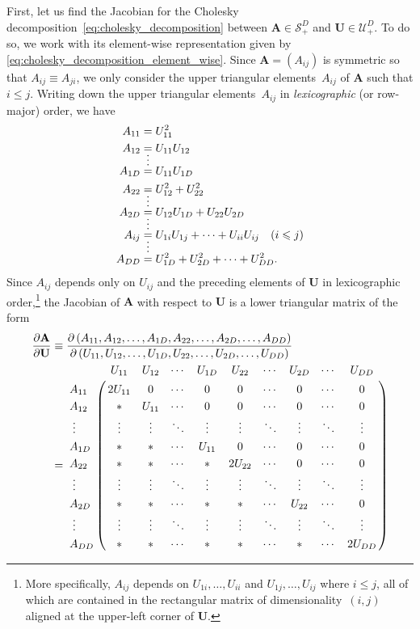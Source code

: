\documentclass[12pt,a4paper]{article}
\begin{document}
First, let us find the Jacobian for
the Cholesky decomposition~\eqref{eq:cholesky_decomposition} between
$\mathbf{A} \in \mathcal{S}_{+}^{D}$ and $\mathbf{U} \in \mathcal{U}_{+}^{D}$.
To do so, we work with its element-wise representation given by
\eqref{eq:cholesky_decomposition_element_wise}.
Since $\mathbf{A} = \left( A_{ij} \right)$ is symmetric so that $A_{ij} \equiv A_{ji}$,
we only consider the upper triangular elements~$A_{ij}$ of $\mathbf{A}$ such that $i \leqslant j$.
Writing down the upper triangular elements~$A_{ij}$ in \emph{lexicographic} (or row-major) order,
we have
\begin{align}
A_{11} &= U_{11}^{2} \\
A_{12} &= U_{11} U_{12} \\
\shortvdotswithin{=}
A_{1D} &= U_{11} U_{1D} \\
A_{22} &= U_{12}^{2} + U_{22}^{2} \\
\shortvdotswithin{=}
A_{2D} &= U_{12} U_{1D} + U_{22} U_{2D} \\
\shortvdotswithin{=}
A_{ij} &= U_{1i} U_{1j} + \dots + U_{ii} U_{ij} \quad (i \leqslant j) \\
\shortvdotswithin{=}
A_{DD} &= U_{1D}^{2} + U_{2D}^{2} + \dots + U_{DD}^{2} .
\end{align}
Since $A_{ij}$ depends only on $U_{ij}$ and the preceding elements of $\mathbf{U}$
in lexicographic order,\footnote{%
More specifically, $A_{ij}$ depends on
$U_{1i}, \dots, U_{ii}$ and
$U_{1j}, \dots, U_{ij}$ where $i \leqslant j$,
all of which are contained in the rectangular matrix of dimensionality~$(i, j)$
aligned at the upper-left corner of $\mathbf{U}$.}
the Jacobian of $\mathbf{A}$ with respect to $\mathbf{U}$ is
a lower triangular matrix of the form
\begin{align}
\frac{\partial\mathbf{A}}{\partial\mathbf{U}}
&\equiv
\frac{\partial \left( A_{11}, A_{12}, \dots, A_{1D}, A_{22}, \dots, A_{2D}, \dots, A_{DD} \right)}
{\partial \left( U_{11}, U_{12}, \dots, U_{1D}, U_{22}, \dots, U_{2D}, \dots, U_{DD} \right)}
\label{eq:definition_of_jacobian_of_cholesky_decomposition}
\\
&=
\bordermatrix{
         &   U_{11} & U_{12} & \cdots & U_{1D} &   U_{22} & \cdots & U_{2D} & \cdots &   U_{DD} \cr
  A_{11} & 2 U_{11} & 0      & \cdots & 0      & 0        & \cdots & 0      & \cdots & 0        \cr
  A_{12} & \ast     & U_{11} & \cdots & 0      & 0        & \cdots & 0      & \cdots & 0        \cr
\;\vdots & \vdots   & \vdots & \ddots & \vdots & \vdots   & \ddots & \vdots & \ddots & \vdots   \cr
  A_{1D} & \ast     & \ast   & \cdots & U_{11} & 0        & \cdots & 0      & \cdots & 0        \cr
  A_{22} & \ast     & \ast   & \cdots & \ast   & 2 U_{22} & \cdots & 0      & \cdots & 0        \cr
\;\vdots & \vdots   & \vdots & \ddots & \vdots & \vdots   & \ddots & \vdots & \ddots & \vdots   \cr
  A_{2D} & \ast     & \ast   & \cdots & \ast   & \ast     & \cdots & U_{22} & \cdots & 0        \cr
\;\vdots & \vdots   & \vdots & \ddots & \vdots & \vdots   & \ddots & \vdots & \ddots & \vdots   \cr
  A_{DD} & \ast     & \ast   & \cdots & \ast   & \ast     & \cdots & \ast   & \cdots & 2 U_{DD}
}
\end{align}
\end{document}

